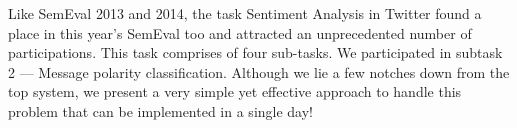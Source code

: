 Like SemEval 2013 and 2014, the task Sentiment Analysis in Twitter found a place in this year's SemEval too and attracted an unprecedented number of participations. This task comprises of four sub-tasks. We participated in subtask 2 --- Message polarity classification. Although we lie a few notches down from the top system, we present a very simple yet effective approach to handle this problem that can be implemented in a single day!
